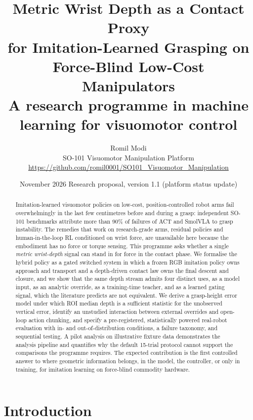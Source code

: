 \documentclass[11pt,a4paper]{article}
\title{\vspace{-1.2cm}
Metric Wrist Depth as a Contact Proxy\\
for Imitation-Learned Grasping on Force-Blind Low-Cost Manipulators\\[0.4em]
{\large A research programme in machine learning for visuomotor control}}
\author{Romil Modi\\
\small SO-101 Visuomotor Manipulation Platform\\
\small\url{https://github.com/romil0001/SO101_Visuomotor_Manipulation}}
\date{November 2026 \quad\textperiodcentered\quad Research proposal, version 1.1 (platform status update)}
\theoremstyle{definition}
\begin{document}
\maketitle

\begin{abstract}
Imitation-learned visuomotor policies on low-cost, position-controlled robot arms fail overwhelmingly in the last few centimetres before and during a grasp: independent SO-101 benchmarks attribute more than 90\% of failures of ACT and SmolVLA to grasp instability. The remedies that work on research-grade arms, residual policies and human-in-the-loop RL conditioned on wrist force, are unavailable here because the embodiment has no force or torque sensing. This programme asks whether a single \emph{metric wrist-depth} signal can stand in for force in the contact phase. We formalise the hybrid policy as a gated switched system in which a frozen RGB imitation policy owns approach and transport and a depth-driven contact law owns the final descent and closure, and we show that the same depth stream admits four distinct uses, as a model input, as an analytic override, as a training-time teacher, and as a learned gating signal, which the literature predicts are not equivalent. We derive a grasp-height error model under which ROI median depth is a sufficient statistic for the unobserved vertical error, identify an unstudied interaction between external overrides and open-loop action chunking, and specify a pre-registered, statistically powered real-robot evaluation with in- and out-of-distribution conditions, a failure taxonomy, and sequential testing. A pilot analysis on illustrative fixture data demonstrates the analysis pipeline and quantifies why the default 15-trial protocol cannot support the comparisons the programme requires. The expected contribution is the first controlled answer to where geometric information belongs, in the model, the controller, or only in training, for imitation learning on force-blind commodity hardware.
\end{abstract}

\section{Introduction}
\label{sec:intro}
\end{document}
